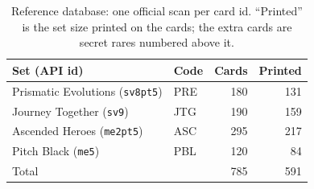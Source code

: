 \begin{table}[htbp]\centering\small
\caption[Reference database]{Reference database: one official scan per card id. ``Printed'' is the set size printed on the cards; the extra cards are secret rares numbered above it.}\label{tab:dataset}
\begin{tabular}{@{}llrr@{}}
\toprule
Set (API id) & Code & Cards & Printed\\
\midrule
Prismatic Evolutions (\texttt{sv8pt5}) & PRE & 180 & 131\\
Journey Together (\texttt{sv9}) & JTG & 190 & 159\\
Ascended Heroes (\texttt{me2pt5}) & ASC & 295 & 217\\
Pitch Black (\texttt{me5}) & PBL & 120 & 84\\
\midrule
Total & & 785 & 591\\
\bottomrule
\end{tabular}
\end{table}
